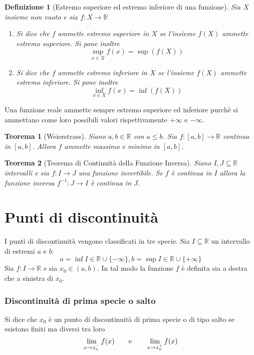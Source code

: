 \documentclass[11pt]{book}
\newtheorem{theorem}{Teorema}[chapter]
\newtheorem{definition}{Definizione}[chapter]
\begin{document}
\begin{definition}[Estremo superiore ed estremo inferiore di una funzione]
    Sia $X$ insieme non vuoto e sia $f:X\rightarrow\mathbb{R}$
    \begin{enumerate}
        \item Si dice che $f$ ammette estremo superiore in $X$ se l'insieme $f(X)$ ammette estremo superiore. Si pone 
        inoltre 
        \begin{equation*}
            \sup_{x\in X}f(x)=\sup(f(X))
        \end{equation*}
        \item Si dice che $f$ ammette estremo inferiore in $X$ se l'insieme $f(X)$ ammette estremo inferiore. Si pone 
        inoltre 
        \begin{equation*}
            \inf_{x\in X}f(x)=\inf(f(X))
        \end{equation*}
    \end{enumerate}
\end{definition}
Una funzione reale ammette sempre estremo superiore ed inferiore purchè si ammettano come loro possibili valori rispettivamente
$+\infty$ e $-\infty$.
\begin{theorem}[Weierstrass]
    Siano $a,b\in\mathbb{R}$ con $a\leq b$. Sia $f:[a,b]\rightarrow\mathbb{R}$ continua in $[a,b]$. Allora $f$ ammette 
    massimo e minimo in $[a,b]$.
\end{theorem}
\begin{theorem}[Teorema di Continuità della Funzione Inversa]
    Siano $I,J\subseteq\mathbb{R}$ intervalli e sia $f:I\rightarrow J$ una funzione invertibile. Se $f$ è continua in $I$
    allora la funzione inversa $f^{-1}:J\rightarrow I$ è continua in $J$.
\end{theorem}
\section{Punti di discontinuità}
I punti di discontinuità vengono classificati in tre specie. Sia $I\subseteq\mathbb{R}$ un intervallo di estremi $a$ e $b$:
\begin{equation*}
    a=\inf I\in\mathbb{R}\cup\{-\infty\}, b=\sup I\in\mathbb{R}\cup\{+\infty\}
\end{equation*}
Sia $f:I\rightarrow\mathbb{R}$ e sia $x_0\in(a,b)$. In tal modo la funzione $f$ è definita sia a destra che a sinistra di 
$x_0$.
\subsubsection*{Discontinuità di prima specie o salto}
Si dice che $x_0$ è un punto di discontinuità di prima specie o di tipo salto se esistono finiti ma diversi tra loro 
\begin{equation*}
    \lim_{x\rightarrow x_0^-}f(x)\qquad\textnormal{e}\qquad\lim_{x\rightarrow x_0^+}f(x)
\end{equation*}
\end{document}

